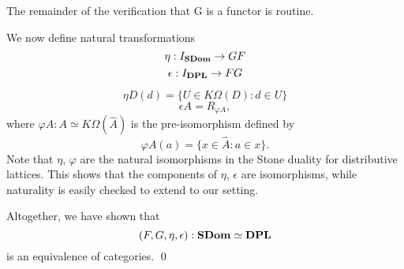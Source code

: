 The remainder of the verification that G is a functor is routine.

We now define natural transformations
\[ \eta : I_{{\bf SDom}} \rightarrow GF \]
\[ \epsilon : I_{{\bf DPL}} \rightarrow FG \]

\[ \eta D(d) = \{U \in K\Omega (D) : d \in U\} \]
\[ \epsilon A = R_{\varphi A}, \]
where $\varphi A : A \simeq K\Omega (\hat{A})$ is the pre-isomorphism defined by
\[ \varphi A(a) = \{x \in \hat{A} : a \in x\}. \]
Note that $\eta$, $\varphi$ are the natural isomorphisms in the Stone duality for distributive lattices. This shows that the components of $\eta$, $\epsilon$ are isomorphisms, while naturality is easily checked to extend to our setting.

Altogether, we have shown that 
\[ (F, G, \eta , \epsilon ) : {\bf SDom} \simeq {\bf DPL} \]
is an equivalence of categories. \qed
